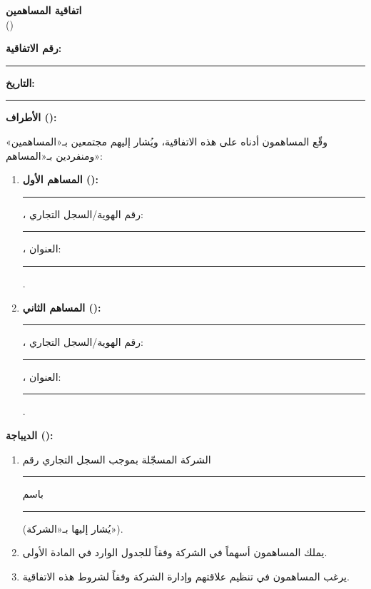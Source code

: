 \documentclass[12pt,a4paper]{article}
\begin{document}
\begin{center}
{\LARGE\bfseries اتفاقية المساهمين}\\[0.5em]
{\large ()}\\[1em]
\end{center}

\vspace{0.5em}

\noindent\textbf{رقم الاتفاقية:} \rule{4cm}{0.4pt} \hfill \textbf{التاريخ:} \rule{4cm}{0.4pt}

\vspace{1em}

\noindent\textbf{الأطراف ():}

\noindent وقّع المساهمون أدناه على هذه الاتفاقية، ويُشار إليهم مجتمعين بـ«المساهمين» ومنفردين بـ«المساهم»:

\begin{enumerate}
    \item \textbf{المساهم الأول ():} \rule{6cm}{0.4pt}، رقم الهوية/السجل التجاري: \rule{4cm}{0.4pt}، العنوان: \rule{5cm}{0.4pt}.

    \item \textbf{المساهم الثاني ():} \rule{6cm}{0.4pt}، رقم الهوية/السجل التجاري: \rule{4cm}{0.4pt}، العنوان: \rule{5cm}{0.4pt}.

\end{enumerate}

\vspace{1em}

\noindent\textbf{الديباجة ():}

\begin{enumerate}
    \item الشركة المسجّلة بموجب السجل التجاري رقم \rule{4cm}{0.4pt} باسم \rule{6cm}{0.4pt} (يُشار إليها بـ«الشركة»).
    \item يملك المساهمون أسهماً في الشركة وفقاً للجدول الوارد في المادة الأولى.
    \item يرغب المساهمون في تنظيم علاقتهم وإدارة الشركة وفقاً لشروط هذه الاتفاقية.
\end{enumerate}

\vspace{1em}
\end{document}
